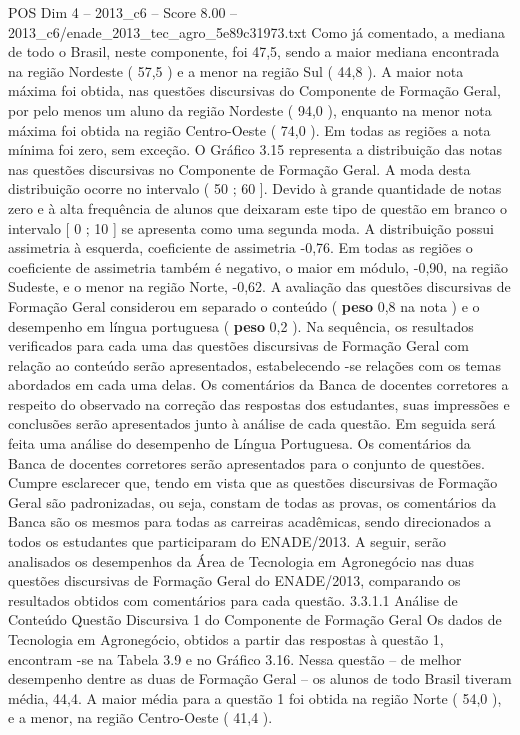 \begin{textsample}{POS Dim 4 – 2013\_c6 – Score 8.00 – 2013\_c6/enade\_2013\_tec\_agro\_5e89c31973.txt}
Como já comentado, a mediana de todo o Brasil, neste componente, foi 47,5, sendo a maior mediana encontrada na região Nordeste ( 57,5 ) e a menor na região Sul ( 44,8 ).
A maior nota máxima foi obtida, nas questões discursivas do Componente de Formação Geral, por pelo menos um aluno da região Nordeste ( 94,0 ), enquanto na menor nota máxima foi obtida na região Centro-Oeste ( 74,0 ).
Em todas as regiões a nota mínima foi zero, sem exceção.
O Gráfico 3.15 representa a distribuição das notas nas questões discursivas no Componente de Formação Geral.
A moda desta distribuição ocorre no intervalo ( 50 ; 60 ].
Devido à grande quantidade de notas zero e à alta frequência de alunos que deixaram este tipo de questão em branco o intervalo [ 0 ; 10 ] se apresenta como uma segunda moda.
A distribuição possui assimetria à esquerda, coeficiente de assimetria -0,76.
Em todas as regiões o coeficiente de assimetria também é negativo, o maior em módulo, -0,90, na região Sudeste, e o menor na região Norte, -0,62.
A avaliação das questões discursivas de Formação Geral considerou em separado o conteúdo ( \textbf{peso} 0,8 na nota ) e o desempenho em língua portuguesa ( \textbf{peso} 0,2 ).
Na sequência, os resultados verificados para cada uma das questões discursivas de Formação Geral com relação ao conteúdo serão apresentados, estabelecendo -se relações com os temas abordados em cada uma delas.
Os comentários da Banca de docentes corretores a respeito do observado na correção das respostas dos estudantes, suas impressões e conclusões serão apresentados junto à análise de cada questão.
Em seguida será feita uma análise do desempenho de Língua Portuguesa.
Os comentários da Banca de docentes corretores serão apresentados para o conjunto de questões.
Cumpre esclarecer que, tendo em vista que as questões discursivas de Formação Geral são padronizadas, ou seja, constam de todas as provas, os comentários da Banca são os mesmos para todas as carreiras acadêmicas, sendo direcionados a todos os estudantes que participaram do ENADE/2013.
A seguir, serão analisados os desempenhos da Área de Tecnologia em Agronegócio nas duas questões discursivas de Formação Geral do ENADE/2013, comparando os resultados obtidos com comentários para cada questão. 3.3.1.1 Análise de Conteúdo Questão Discursiva 1 do Componente de Formação Geral Os dados de Tecnologia em Agronegócio, obtidos a partir das respostas à questão 1, encontram -se na Tabela 3.9 e no Gráfico 3.16.
Nessa questão – de melhor desempenho dentre as duas de Formação Geral – os alunos de todo Brasil tiveram média, 44,4.
A maior média para a questão 1 foi obtida na região Norte ( 54,0 ), e a menor, na região Centro-Oeste ( 41,4 ).

\end{textsample}
